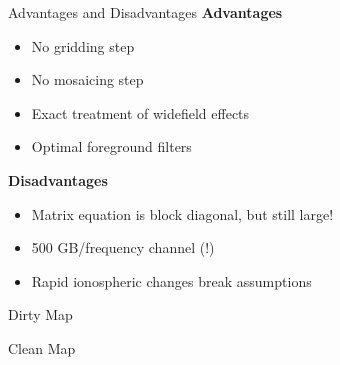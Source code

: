 \documentclass{beamer}
\begin{document}
\begin{frame}{Advantages and Disadvantages}
    \textbf{Advantages}
    \begin{itemize}[label=\textbullet]
        \item No gridding step
        \item No mosaicing step
        \item Exact treatment of widefield effects
        \item Optimal foreground filters
    \end{itemize}
    \textbf{Disadvantages}
    \begin{itemize}[label=\textbullet]
        \item Matrix equation is block diagonal, but still large!
        \item 500 GB/frequency channel (!)
        \item Rapid ionospheric changes break assumptions
    \end{itemize}
\end{frame}

{
    \begin{frame}{Dirty Map}
    \end{frame}

    \begin{frame}{Clean Map}
    \end{frame}
}
\end{document}
